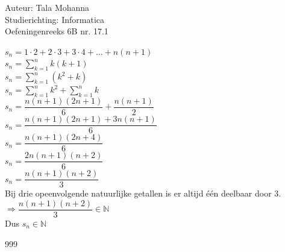 \documentclass[a4paper]{article}
\begin{document}
\noindent \large Auteur: Tala Mohanna \\
\noindent \large Studierichting: Informatica\\
\noindent \large Oefeningenreeks 6B nr. 17.1\\

\medskip

\normalsize

$\displaystyle s_n = 1\cdot2 + 2\cdot3 + 3\cdot4 + \ldots + n(n+1)$ \\

$\displaystyle s_n = \displaystyle\sum\limits_{k=1}^{n} k(k+1)$ \\

$\displaystyle s_n = \displaystyle\sum\limits_{k=1}^{n} (k^2+k)$ \\

$\displaystyle s_n = \displaystyle\sum\limits_{k=1}^{n} k^2 + \displaystyle\sum\limits_{k=1}^{n} k$ \\

$\displaystyle s_n = \dfrac{n(n+1)(2n+1)}{6} + \dfrac{n(n+1)}{2}$ \\

$\displaystyle s_n = \dfrac{n(n+1)(2n+1) + 3n(n+1)}{6}$ \\

$\displaystyle s_n = \dfrac{n(n+1)(2n+4)}{6}$ \\

$\displaystyle s_n = \dfrac{2n(n+1)(n+2)}{6}$ \\

$\displaystyle s_n = \dfrac{n(n+1)(n+2)}{3}$ \\

Bij drie opeenvolgende natuurlijke getallen is er altijd één deelbaar door 3. \\

$\Rightarrow \dfrac{n(n+1)(n+2)}{3} \in \mathbb{N}$ \\

Dus $s_n \in \mathbb{N}$ \\

\begin{thebibliography}{999}
\end{thebibliography}
\end{document}
